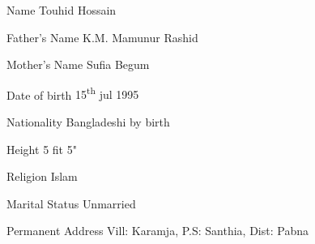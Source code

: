 

\begin{cvskills}
	\cvskill
	{Name}
	{Touhid Hossain}
	
	\cvskill
	{Father's Name}
	{K.M. Mamunur Rashid}
	
	\cvskill
	{Mother's Name}
	{Sufia Begum}
	
	\cvskill
	{Date of birth}
	{15\textsuperscript{th} jul 1995}
	
	\cvskill
	{Nationality}
	{Bangladeshi by birth}
	
	\cvskill
	{Height}
	{5 fit 5"}
	
	\cvskill
	{Religion}
	{Islam}
	
	\cvskill
	{Marital Status}
	{Unmarried}
	
	\cvskill
	{Permanent Address }
	{Vill: Karamja, P.S: Santhia, Dist: Pabna}
	
\end{cvskills}